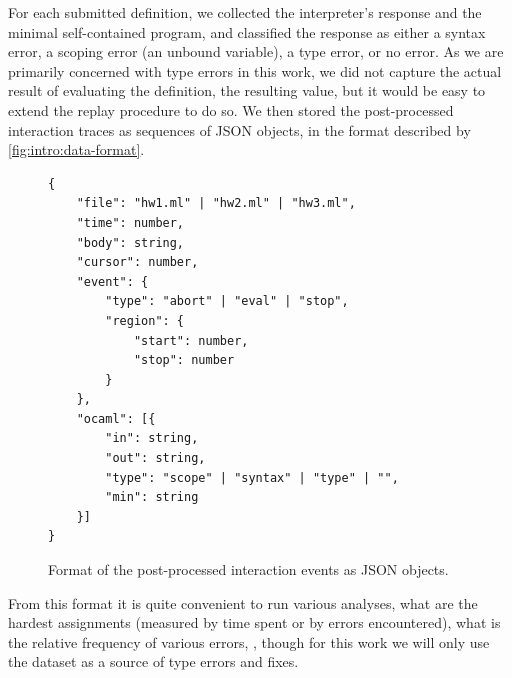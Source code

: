 For each submitted definition, we collected the interpreter's response
and the minimal self-contained program, and classified the response as
either a syntax error, a scoping error (\eg an unbound variable), a type
error, or no error.
%
As we are primarily concerned with type errors in this work, we did not
capture the actual result of evaluating the definition, \ie the
resulting value, but it would be easy to extend the replay procedure to
do so.
%
We then stored the post-processed interaction traces as sequences of
JSON objects, in the format described by
\autoref{fig:intro:data-format}.
%
\begin{figure}
\centering
\begin{lstlisting}
{
    "file": "hw1.ml" | "hw2.ml" | "hw3.ml",
    "time": number,
    "body": string,
    "cursor": number,
    "event": {
        "type": "abort" | "eval" | "stop",
        "region": {
            "start": number,
            "stop": number
        }
    },
    "ocaml": [{
        "in": string,
        "out": string,
        "type": "scope" | "syntax" | "type" | "",
        "min": string
    }]
}
\end{lstlisting}
\caption{Format of the post-processed interaction events as JSON
  objects.}
\label{fig:intro:data-format}
\end{figure}
%
From this format it is quite convenient to run various analyses, \eg
what are the hardest assignments (measured by time spent or by errors
encountered), what is the relative frequency of various errors, \etc,
though for this work we will only use the dataset as a source of type
errors and fixes.


